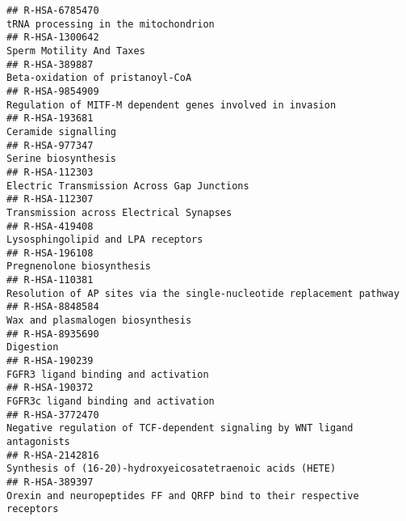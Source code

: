 \documentclass[
]{article}
\begin{document}
\begin{verbatim}
## R-HSA-6785470                                                                                                 tRNA processing in the mitochondrion
## R-HSA-1300642                                                                                                             Sperm Motility And Taxes
## R-HSA-389887                                                                                                      Beta-oxidation of pristanoyl-CoA
## R-HSA-9854909                                                                            Regulation of MITF-M dependent genes involved in invasion
## R-HSA-193681                                                                                                                   Ceramide signalling
## R-HSA-977347                                                                                                                   Serine biosynthesis
## R-HSA-112303                                                                                            Electric Transmission Across Gap Junctions
## R-HSA-112307                                                                                              Transmission across Electrical Synapses 
## R-HSA-419408                                                                                                    Lysosphingolipid and LPA receptors
## R-HSA-196108                                                                                                             Pregnenolone biosynthesis
## R-HSA-110381                                                                  Resolution of AP sites via the single-nucleotide replacement pathway
## R-HSA-8848584                                                                                                     Wax and plasmalogen biosynthesis
## R-HSA-8935690                                                                                                                            Digestion
## R-HSA-190239                                                                                                   FGFR3 ligand binding and activation
## R-HSA-190372                                                                                                  FGFR3c ligand binding and activation
## R-HSA-3772470                                                             Negative regulation of TCF-dependent signaling by WNT ligand antagonists
## R-HSA-2142816                                                                            Synthesis of (16-20)-hydroxyeicosatetraenoic acids (HETE)
## R-HSA-389397                                                               Orexin and neuropeptides FF and QRFP bind to their respective receptors

\end{verbatim}
\end{document}
